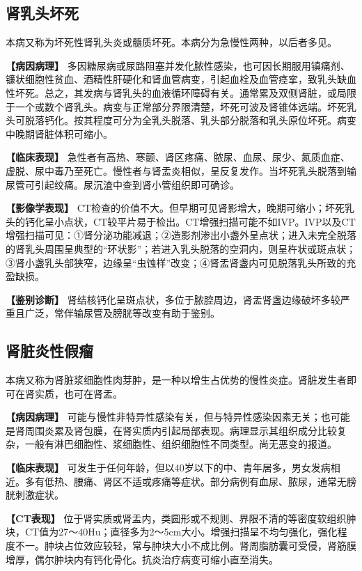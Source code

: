 \subsection{肾乳头坏死}

本病又称为坏死性肾乳头炎或髓质坏死。本病分为急慢性两种，以后者多见。

\textbf{【病因病理】}
多因糖尿病或尿路阻塞并发化脓性感染，也可因长期服用镇痛剂、镰状细胞性贫血、酒精性肝硬化和肾血管病变，引起血栓及血管痉挛，致乳头缺血性坏死。总之，其发病与肾乳头的血液循环障碍有关。通常累及双侧肾脏，或局限于一个或数个肾乳头。病变与正常部分界限清楚，坏死可波及肾锥体远端。坏死乳头可脱落钙化。按其程度可分为全乳头脱落、乳头部分脱落和乳头原位坏死。病变中晚期肾脏体积可缩小。

\textbf{【临床表现】}
急性者有高热、寒颤、肾区疼痛、脓尿、血尿、尿少、氮质血症、虚脱、尿中毒乃至死亡。慢性者与肾盂炎相似，呈反复发作。当坏死乳头脱落到输尿管可引起绞痛。尿沉渣中查到肾小管组织即可确诊。

\textbf{【影像学表现】}
CT检查的价值不大。但早期可见肾影增大，晚期可缩小；坏死乳头的钙化呈小点状，CT较平片易于检出。CT增强扫描可能不如IVP。IVP以及CT增强扫描可见：①肾分泌功能减退；②造影剂渗出小盏外呈点状；进入未完全脱落的肾乳头周围呈典型的“环状影”；若进入乳头脱落的空洞内，则呈杵状或斑点状；③肾小盏乳头部狭窄，边缘呈“虫蚀样”改变；④肾盂肾盏内可见脱落乳头所致的充盈缺损。

\textbf{【鉴别诊断】}
肾结核钙化呈斑点状，多位于脓腔周边，肾盂肾盏边缘破坏多较严重且广泛，常伴输尿管及膀胱等改变有助于鉴别。

\subsection{肾脏炎性假瘤}

本病又称为肾脏浆细胞性肉芽肿，是一种以增生占优势的慢性炎症。肾脏发生者即可在肾实质，也可在肾盂。

\textbf{【病因病理】}
可能与慢性非特异性感染有关，但与特异性感染因素无关；也可能是肾周围炎累及肾包膜，在肾实质内引起局部表现。病理显示其组织成分比较复杂，一般有淋巴细胞性、浆细胞性、组织细胞性不同类型。尚无恶变的报道。

\textbf{【临床表现】}
可发生于任何年龄，但以40岁以下的中、青年居多，男女发病相近。多有低热、腰痛、肾区不适或疼痛等症状。部分病例有血尿、脓尿，通常无膀胱刺激症状。

\textbf{【CT表现】}
位于肾实质或肾盂内，类圆形或不规则、界限不清的等密度软组织肿块，CT值为27～40Hu；直径多为2～5cm大小。增强扫描呈不均匀强化，强化程度不一。肿块占位效应较轻，常与肿块大小不成比例。肾周脂肪囊可受侵，肾筋膜增厚，偶尔肿块内有钙化骨化。抗炎治疗病变可缩小直至消失。

